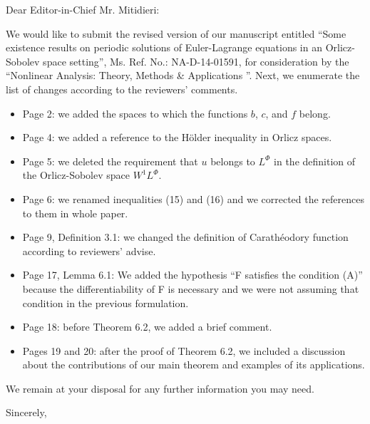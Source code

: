 \documentclass[12pt]{letter}
\begin{document}
\begin{letter}{ %
  }
 
\opening{ Dear Editor-in-Chief Mr. Mitidieri:}

We would like to submit the revised version of our manuscript entitled  ``Some existence results on periodic solutions of Euler-Lagrange equations in an Orlicz-Sobolev space setting'', Ms. Ref. No.: NA-D-14-01591, for consideration by the ``Nonlinear Analysis: Theory, Methods \& Applications ''.
Next, we enumerate the list of changes according to the reviewers' comments.

\begin{itemize}

\item Page 2: we added the spaces to which the functions $b$, $c$, and $f$ belong.
\item Page 4: we added a reference to the H\"older inequality in Orlicz spaces.
\item Page 5:  we deleted the requirement that $u$ belongs to $L^{\Phi}$  in the definition of the Orlicz-Sobolev space $W^1L^{\Phi}$.
\item Page 6: we renamed inequalities (15) and (16) and we corrected the references  to them in whole paper.
\item Page 9, Definition 3.1: we changed the definition of  Carath\'eodory function according to reviewers' advise.
\item Page 17, Lemma 6.1: We added  the hypothesis ``F satisfies the condition (A)'' because the differentiability of F is necessary and we were not assuming that condition in the previous formulation.
\item Page 18: before Theorem 6.2, we added a brief comment.  
\item Pages 19 and 20: after the proof of Theorem 6.2, we included a discussion about the contributions of our main theorem and examples of its applications. 

\end{itemize}
We remain at your disposal for any further information you may need.


\closing{Sincerely, }
\end{letter}
\end{document}
